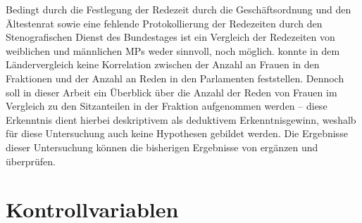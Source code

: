 \documentclass[12pt, 
    twoside=false, 
    bibliography=totoc, 
    numbers=endperiod, 
    headings=normal, 
    toc=chapterentrydotfill
    ]{scrbook}
\begin{document}
Bedingt durch die Festlegung der Redezeit durch die Geschäftsordnung und den Ältestenrat sowie eine fehlende Protokollierung der Redezeiten durch den Stenografischen Dienst des Bundestages ist ein Vergleich der Redezeiten von weiblichen und männlichen MPs weder sinnvoll, noch möglich.
\textcite{back_2018} konnte in dem Ländervergleich keine Korrelation zwischen der Anzahl an Frauen in den Fraktionen und der Anzahl an Reden in den Parlamenten feststellen. Dennoch soll in dieser Arbeit ein Überblick über die Anzahl der Reden von Frauen im Vergleich zu den Sitzanteilen in der Fraktion aufgenommen werden -- diese Erkenntnis dient hierbei deskriptivem als deduktivem Erkenntnisgewinn, weshalb für diese Untersuchung auch keine Hypothesen gebildet werden. Die Ergebnisse dieser Untersuchung können die bisherigen Ergebnisse von \textcite{back_2018} ergänzen und überprüfen.

\section{Kontrollvariablen}
\end{document}
